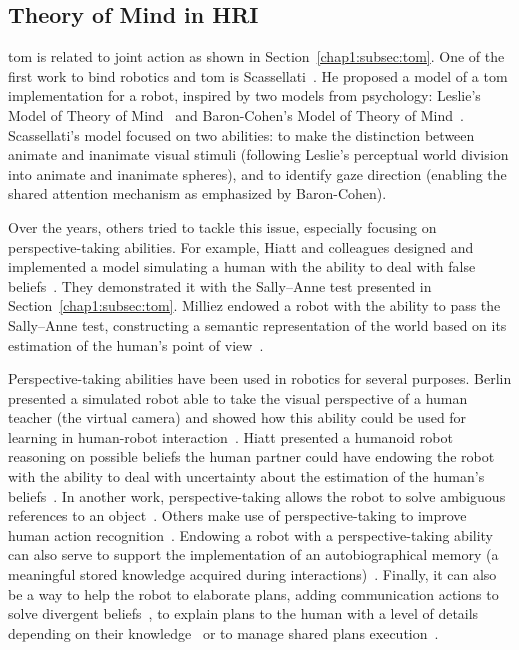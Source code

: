 \documentclass[a4paper,11pt,twoside]{StyleThese}
\begin{document}
\subsection{Theory of Mind in HRI}\label{chap2:subsec:tom_hri}
\acrfull{tom} is related to joint action as shown in Section~\ref{chap1:subsec:tom}. One of the first work to bind robotics and \acrshort{tom} is Scassellati~\cite{scassellati_2002_theory}. He proposed a model of a \acrshort{tom} implementation for a robot, inspired by two models from psychology: Leslie’s Model of Theory of Mind~\cite{leslie_1984_spatiotemporal} and Baron-Cohen’s Model of Theory of Mind~\cite{baron-cohen_1995_mindblindness}. Scassellati's model focused on two abilities: to make the distinction between animate and inanimate visual stimuli (following Leslie's perceptual world division into animate and inanimate spheres), and to identify gaze direction (enabling the shared attention mechanism as emphasized by Baron-Cohen). 

Over the years, others tried to tackle this issue, especially focusing on perspective-taking abilities. For example, Hiatt and colleagues designed and implemented a model simulating a human with the ability to deal with false beliefs~\cite{hiatt_2010_cognitive}. They demonstrated it with the Sally--Anne test presented in Section~\ref{chap1:subsec:tom}. Milliez \etal{} endowed a robot with the ability to pass the Sally--Anne test, constructing a semantic representation of the world based on its estimation of the human's point of view~\cite{milliez_2014_framework}.

Perspective-taking abilities have been used in robotics for several purposes. Berlin \etal{} presented a simulated robot able to take the visual perspective of a human teacher (the virtual camera) and showed how this ability could be used for learning in human-robot interaction~\cite{berlin_2006_perspective}. Hiatt \etal{} presented a humanoid robot reasoning on possible beliefs the human partner could have endowing the robot with the ability to deal with uncertainty about the estimation of the human's beliefs~\cite{hiatt_2011_accommodating}. In another work, perspective-taking allows the robot to solve ambiguous references to an object~\cite{ros_2010_solving}. Others make use of perspective-taking to improve human action recognition~\cite{johnson_2005_perceptual}. Endowing a robot with a perspective-taking ability can also serve to support the implementation of an autobiographical memory (a meaningful stored knowledge acquired during interactions)~\cite{pointeau_2017_role}. Finally, it can also be a way to help the robot to elaborate plans, adding communication actions to solve divergent beliefs~\cite{warnier_2012_robot}, to explain plans to the human with a level of details depending on their knowledge~\cite{milliez_2016_using} or to manage shared plans execution~\cite{devin_2016_implemented}.
\end{document}
